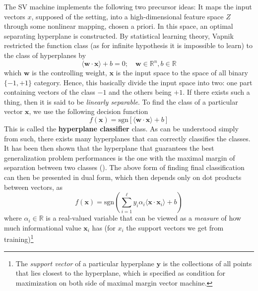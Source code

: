 \documentclass[10pt]{article}
\begin{document}
The SV machine implements the following two precursor ideas: It maps the input vectors $x$, supposed of the setting, into a high-dimensional feature space $Z$ through some nonlinear mapping, chosen a priori. In this space, an optimal separating hyperplane is constructed. By statistical learning theory, Vapnik restricted the function class (as for infinite hypothesis it is impossible to learn) to the class of hyperplanes by 
\begin{equation}
    \langle \mathbf{w}\cdot \mathbf{x} \rangle + b = 0 ; \quad \mathbf{w}\in \mathbb{R}^{n} , b\in \mathbb{R}
\end{equation}
which $\mathbf{w}$ is the controlling weight, $\mathbf{x}$ is the input space to the space of all binary $\{-1,+1\}$ category. Hence, this basically divide the input space into two: one part containing vectors of the class $-1$ and the others being $+1$. If there exists such a thing, then it is said to be \textit{linearly separable}. To find the class of a particular vector $\mathbf{x}$, we use the following decision function 
\begin{equation}
    f(\mathbf{x}) = \mathrm{sgn}[\langle \mathbf{w}\cdot \mathbf{x}\rangle+ b]
\end{equation}
This is called the \textbf{hyperplane classifier} class. As can be understood simply from such, there exists many hyperplanes that can correctly classifies the classes. It has been then shown that the hyperplane that guarantees the best generalization problem performances is the one with the maximal margin of separation between two classes (\cite{Cristianini2000AnIT}). The above form of finding final classification can then be presented in dual form, which then depends only on dot products between vectors, as 
\begin{equation}
    f(\mathbf{x}) = \mathrm{sgn}\left(\sum^{\ell}_{i=1} y_{i}\alpha_{i} \langle \mathbf{x}\cdot \mathbf{x}_{i} \rangle+ b\right)
\end{equation} where $\alpha_{i}\in \mathbb{R}$ is a real-valued variable that can be viewed as a \textit{measure} of how much informational value $\mathbf{x}_{i}$ has (for $x_{i}$ the support vectors we get from training)\footnote{The \textit{support vector} of a particular hyperplane $\mathbf{y}$ is the collections of all points that lies closest to the hyperplane, which is specified as condition for maximization on both side of maximal margin vector machine.}
\end{document}
